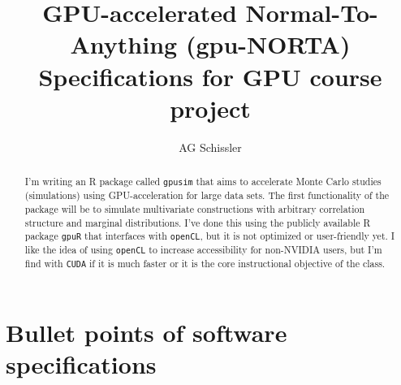 \documentclass{article}
\begin{document}
\title{GPU-accelerated Normal-To-Anything (gpu-NORTA)\\ \large Specifications for GPU course project}
\author{AG Schissler}

\maketitle

\begin{abstract}
\noindent I'm writing an R package called \texttt{gpusim} that aims to accelerate Monte Carlo studies (simulations) using GPU-acceleration for large data sets. The first functionality of the package will be to simulate multivariate constructions with arbitrary correlation structure and marginal distributions. I've done this using the publicly available R package \texttt{gpuR} that interfaces with \texttt{openCL}, but it is not optimized or user-friendly yet. I like the idea of using \texttt{openCL} to increase accessibility for non-NVIDIA users, but I'm find with \texttt{CUDA} if it is much faster or it is the core instructional objective of the class. 
\end{abstract}

\section*{Bullet points of software specifications}
\end{document}
